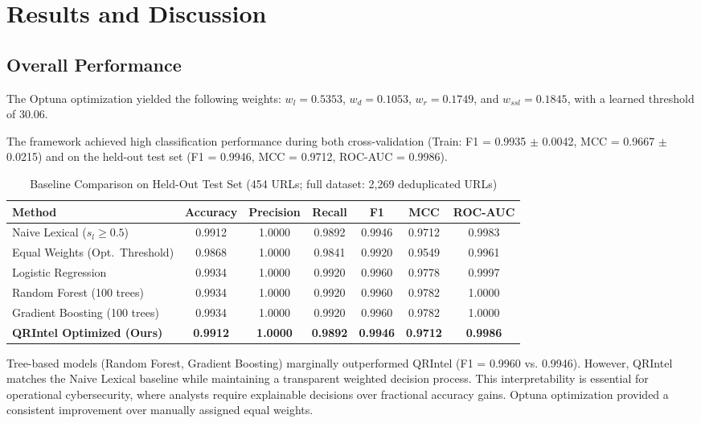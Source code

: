 \documentclass[10pt,twocolumn,letterpaper]{article}
\begin{document}
\section{Results and Discussion}

\subsection{Overall Performance}

The Optuna optimization yielded the following weights: $w_l = 0.5353$,
$w_d = 0.1053$, $w_r = 0.1749$, and $w_{ssl} = 0.1845$, with a learned
threshold of 30.06.

The framework achieved high classification performance during both
cross-validation (Train: F1 = 0.9935 $\pm$ 0.0042, MCC = 0.9667 $\pm$
0.0215) and on the held-out test set (F1 = 0.9946, MCC = 0.9712,
ROC-AUC = 0.9986).

\begin{table}[t]
\centering
\caption{Baseline Comparison on Held-Out Test Set (454 URLs; full dataset:
2,269 deduplicated URLs)}
\begin{tabular}{lcccccc}
\toprule
\textbf{Method} & \textbf{Accuracy} & \textbf{Precision} & \textbf{Recall}
  & \textbf{F1} & \textbf{MCC} & \textbf{ROC-AUC} \\
\midrule
Naive Lexical ($s_l \geq 0.5$)      & 0.9912 & 1.0000 & 0.9892 & 0.9946
  & 0.9712 & 0.9983 \\
Equal Weights (Opt.\ Threshold)      & 0.9868 & 1.0000 & 0.9841 & 0.9920
  & 0.9549 & 0.9961 \\
Logistic Regression                  & 0.9934 & 1.0000 & 0.9920 & 0.9960
  & 0.9778 & 0.9997 \\
Random Forest (100 trees)            & 0.9934 & 1.0000 & 0.9920 & 0.9960
  & 0.9782 & 1.0000 \\
Gradient Boosting (100 trees)        & 0.9934 & 1.0000 & 0.9920 & 0.9960
  & 0.9782 & 1.0000 \\
\textbf{QRIntel Optimized (Ours)}    & \textbf{0.9912} & \textbf{1.0000}
  & \textbf{0.9892} & \textbf{0.9946} & \textbf{0.9712} & \textbf{0.9986} \\
\bottomrule
\end{tabular}
\end{table}

Tree-based models (Random Forest, Gradient Boosting) marginally outperformed QRIntel (F1 = 0.9960 vs. 0.9946). However, QRIntel matches the Naive Lexical baseline while maintaining a transparent weighted decision process. This interpretability is essential for operational cybersecurity, where analysts require explainable decisions over fractional accuracy gains. Optuna optimization provided a consistent improvement over manually assigned equal weights.
\end{document}
